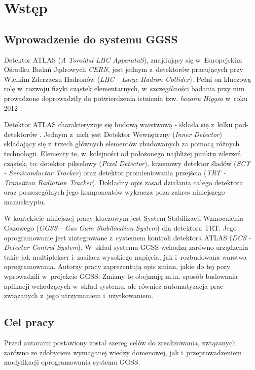 \chapter{Wstęp}
\label{cha:wstep}

\section{Wprowadzenie do systemu GGSS}
Detektor ATLAS (\textit{A Toroidal LHC ApparatuS}), znajdujący się w~Europejskim Ośrodku Badań Jądrowych \textit{CERN}, jest jednym z~detektorów pracujących przy Wielkim Zderzaczu Hadronów (\textit{LHC - Large Hadron Collider}). Pełni on kluczową rolę w~rozwoju fizyki cząstek elementarnych, w~szczególności badania przy nim prowadzone doprowadziły do potwierdzenia istnienia tzw. \textit{bozonu Higgsa} w~roku 2012 \cite{AtlasWikipedia}. \par

Detektor ATLAS charakteryzuje się budową warstwową - składa się z~kilku pod-detektorów \cite{AtlasAGH}. Jednym z~nich jest Detektor Wewnętrzny (\textit{Inner Detector}) składający się z~trzech głównych elementów zbudowanych za pomocą różnych technologii. Elementy te, w~kolejności od położonego najbliżej punktu zderzeń cząstek, to: detektor pikselowy (\textit{Pixel Detector}), krzemowy detektor śladów (\textit{SCT - Semiconductor Tracker}) oraz detektor promieniowania przejścia (\textit{TRT - Transition Radiation Tracker}). Dokładny opis zasad działania całego detektora oraz poszczególnych jego komponentów wykracza poza zakres niniejszego manuskryptu.\par

W kontekście niniejszej pracy kluczowym jest System Stabilizacji Wzmocnienia Gazowego (\textit{GGSS - Gas Gain Stabilisation System}) dla detektora TRT. Jego oprogramowanie jest zintegrowane \cite{AtlasAGH} z~systemem kontroli detektora ATLAS (\textit{DCS - Detector Control System}). W~skład systemu GGSS wchodzą zarówno urządzenia takie jak multiplekser i~zasilacz wysokiego napięcia, jak i~rozbudowana warstwa oprogramowania. Autorzy pracy zaprezentują opis zmian, jakie do tej pory wprowadzili w~projekcie GGSS. Zmiany te obejmują m.in. sposób budowania aplikacji wchodzących w~skład systemu, ale również automatyzacja prac związanych z~jego utrzymaniem i~użytkowaniem.



\section{Cel pracy}
Przed autorami postawiony został szereg celów do zrealizowania, związanych zarówno ze zdobyciem wymaganej wiedzy domenowej, jak i~przeprowadzeniem modyfikacji oprogramowania systemu GGSS. \par

